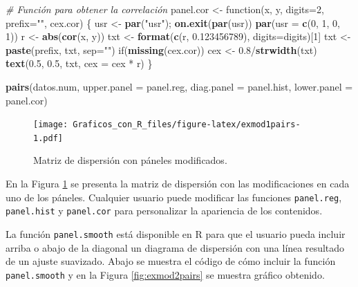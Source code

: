 \documentclass[10pt,]{krantz}
\makeatletter
\newenvironment{Shaded}{\begin{snugshade}}{\end{snugshade}}
\newcommand{\KeywordTok}[1]{\textcolor[rgb]{0.13,0.29,0.53}{\textbf{{#1}}}}
\newcommand{\DataTypeTok}[1]{\textcolor[rgb]{0.13,0.29,0.53}{{#1}}}
\newcommand{\DecValTok}[1]{\textcolor[rgb]{0.00,0.00,0.81}{{#1}}}
\newcommand{\FloatTok}[1]{\textcolor[rgb]{0.00,0.00,0.81}{{#1}}}
\newcommand{\StringTok}[1]{\textcolor[rgb]{0.31,0.60,0.02}{{#1}}}
\newcommand{\CommentTok}[1]{\textcolor[rgb]{0.56,0.35,0.01}{\textit{{#1}}}}
\newcommand{\NormalTok}[1]{{#1}}
\let\proglang=\textsf
\newenvironment{kframe}{%
\medskip{}
\setlength{\fboxsep}{.8em}
 \def\at@end@of@kframe{}%
 \ifinner\ifhmode%
  \def\at@end@of@kframe{\end{minipage}}%
  \begin{minipage}{\columnwidth}%
 \fi\fi%
 \def\FrameCommand##1{\hskip\@totalleftmargin \hskip-\fboxsep
 \colorbox{shadecolor}{##1}\hskip-\fboxsep
     \hskip-\linewidth \hskip-\@totalleftmargin \hskip\columnwidth}%
 \MakeFramed {\advance\hsize-\width
   \@totalleftmargin\z@ \linewidth\hsize
   \@setminipage}}%
 {\par\unskip\endMakeFramed%
 \at@end@of@kframe}
\renewenvironment{Shaded}{\begin{kframe}}{\end{kframe}}
\makeatother
\begin{document}
\begin{Shaded}
\begin{Highlighting}[]
\CommentTok{# Función para obtener la correlación}
\NormalTok{panel.cor <-}\StringTok{ }\NormalTok{function(x, y, }\DataTypeTok{digits=}\DecValTok{2}\NormalTok{, }\DataTypeTok{prefix=}\StringTok{""}\NormalTok{, cex.cor)}
\NormalTok{\{}
  \NormalTok{usr <-}\StringTok{ }\KeywordTok{par}\NormalTok{(}\StringTok{"usr"}\NormalTok{); }\KeywordTok{on.exit}\NormalTok{(}\KeywordTok{par}\NormalTok{(usr))}
  \KeywordTok{par}\NormalTok{(}\DataTypeTok{usr =} \KeywordTok{c}\NormalTok{(}\DecValTok{0}\NormalTok{, }\DecValTok{1}\NormalTok{, }\DecValTok{0}\NormalTok{, }\DecValTok{1}\NormalTok{))}
  \NormalTok{r <-}\StringTok{ }\KeywordTok{abs}\NormalTok{(}\KeywordTok{cor}\NormalTok{(x, y))}
  \NormalTok{txt <-}\StringTok{ }\KeywordTok{format}\NormalTok{(}\KeywordTok{c}\NormalTok{(r, }\FloatTok{0.123456789}\NormalTok{), }\DataTypeTok{digits=}\NormalTok{digits)[}\DecValTok{1}\NormalTok{]}
  \NormalTok{txt <-}\StringTok{ }\KeywordTok{paste}\NormalTok{(prefix, txt, }\DataTypeTok{sep=}\StringTok{""}\NormalTok{)}
  \NormalTok{if(}\KeywordTok{missing}\NormalTok{(cex.cor)) cex <-}\StringTok{ }\FloatTok{0.8}\NormalTok{/}\KeywordTok{strwidth}\NormalTok{(txt)}
  \KeywordTok{text}\NormalTok{(}\FloatTok{0.5}\NormalTok{, }\FloatTok{0.5}\NormalTok{, txt, }\DataTypeTok{cex =} \NormalTok{cex *}\StringTok{ }\NormalTok{r)}
\NormalTok{\}}

\KeywordTok{pairs}\NormalTok{(datos.num,}
      \DataTypeTok{upper.panel =} \NormalTok{panel.reg,}
      \DataTypeTok{diag.panel =} \NormalTok{panel.hist,}
      \DataTypeTok{lower.panel =} \NormalTok{panel.cor)}
\end{Highlighting}
\end{Shaded}

\begin{figure}[htbp]
\centering
\texttt{[image: Graficos\_con\_R\_files/figure-latex/exmod1pairs-1.pdf]}
\caption{\label{fig:exmod1pairs}Matriz de dispersión con páneles
modificados.}
\end{figure}

En la Figura \ref{fig:exmod1pairs} se presenta la matriz de dispersión
con las modificaciones en cada uno de los páneles. Cualquier usuario
puede modificar las funciones \texttt{panel.reg}, \texttt{panel.hist} y
\texttt{panel.cor} para personalizar la apariencia de los contenidos.

La función \texttt{panel.smooth} está disponible en \proglang{R} para
que el usuario pueda incluir arriba o abajo de la diagonal un diagrama
de dispersión con una línea resultado de un ajuste suavizado. Abajo se
muestra el código de cómo incluir la función \texttt{panel.smooth} y en
la Figura \ref{fig:exmod2pairs} se muestra gráfico obtenido.
\end{document}
